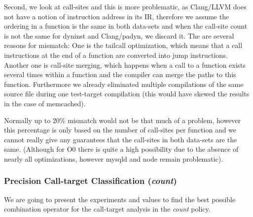 Second, we look at call-sites and this is more problematic, as Clang/LLVM does not have a notion of instruction address in its IR, therefore we assume the ordering in a function is the same in both data-sets and when the call-site count is not the same for dyninst and Clang/padyn, we discard it. The are several reasons for mismatch: One is the tailcall optimization, which means that a call instructions at the end of a function are converted into jump instructions. Another one is call-site merging, which happens when a call to a function exists several times within a function and the compiler can merge the paths to this function.
Furthermore we already eliminated multiple compilations of the same source file during one test-target compilation (this would have skewed the results in the case of memcached).

Normally up to 20\% mismatch would not be that much of a problem, however this percentage is only based on the number of call-sites per function and we cannot really
give any guarantees that the call-sites in both data-sets are the same. (Although for O0 there is quite a high possibility due to the absence of nearly all optimizations,
however mysqld and node remain problematic).

\subsubsection{Precision Call-target Classification (\textit{count})}
\label{subsection:typeshieldprecision}
We are going to present the experiments and values to find the best possible combination operator for the call-target analysis in the \textit{count} policy.

